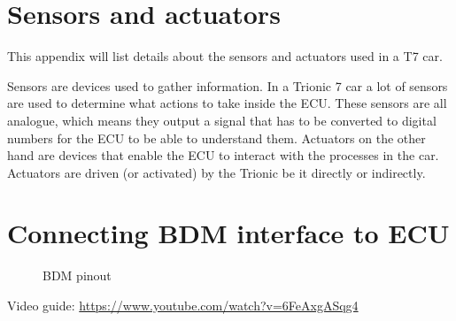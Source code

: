 \documentclass[11pt,a4paper]{book}
\newcommand{\Mfig}[1]{%
\begin{figure}
    \centering
    \missingfigure{#1}
    \caption{#1}
\end{figure}}
\begin{document}
\chapter{Sensors and actuators}
This appendix will list details about the sensors and actuators used in a T7 car.

Sensors are devices used to gather information. In a Trionic 7 car a lot of
sensors are used to determine what actions to take inside the ECU. These sensors
are all analogue, which means they output a signal that has to be converted to
digital numbers for the ECU to be able to understand them. Actuators on the
other hand are devices that enable the ECU to interact with the processes in the
car. Actuators are driven (or activated) by the Trionic be it directly or
indirectly.

\chapter{Connecting BDM interface to ECU}
\Mfig{BDM pinout}

Video guide: \url{https://www.youtube.com/watch?v=6FeAxgASqg4}

\printindex

\printbibliography
\end{document}

